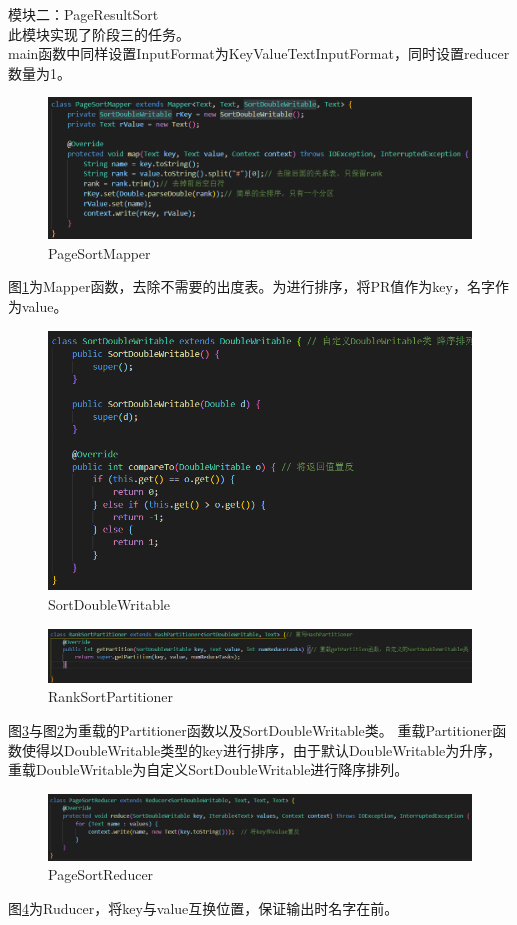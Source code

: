 \documentclass[a4paper,UTF8]{article}
\numberwithin{equation}{section}
\begin{document}
模块二：PageResultSort\\
此模块实现了阶段三的任务。\\
main函数中同样设置InputFormat为KeyValueTextInputFormat，同时设置reducer数量为1。
\begin{figure}[H]
    \centering
    \includegraphics[width = 15cm]{PageSortMapper.png}
    \caption{PageSortMapper}
    \label{PageSortMapper}
\end{figure}
图\ref{PageSortMapper}为Mapper函数，去除不需要的出度表。为进行排序，将PR值作为key，名字作为value。
\begin{figure}[H]
    \centering
    \includegraphics[width = 15cm]{SortDoubleWritable.png}
    \caption{SortDoubleWritable}
    \label{SortDoubleWritable}
\end{figure}
\begin{figure}[H]
    \centering
    \includegraphics[width = 15cm]{RankSortPartitioner.png}
    \caption{RankSortPartitioner}
    \label{RankSortPartitioner}
\end{figure}
图\ref{RankSortPartitioner}与图\ref{SortDoubleWritable}为重载的Partitioner函数以及SortDoubleWritable类。
重载Partitioner函数使得以DoubleWritable类型的key进行排序，由于默认DoubleWritable为升序，重载DoubleWritable为自定义SortDoubleWritable进行降序排列。
\begin{figure}[H]
    \centering
    \includegraphics[width = 15cm]{PageSortReducer.png}
    \caption{PageSortReducer}
    \label{PageSortReducer}
\end{figure}
图\ref{PageSortReducer}为Ruducer，将key与value互换位置，保证输出时名字在前。
\end{document}
